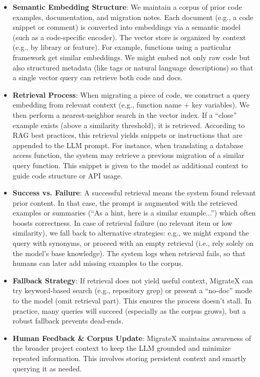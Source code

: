 \documentclass[twocolumn]{article}
\begin{document}
\begin{itemize}
    \item \textbf{Semantic Embedding Structure}: We maintain a corpus of prior code examples, documentation, and migration notes. Each document (e.g., a code snippet or comment) is converted into embeddings via a semantic model (such as a code-specific encoder). The vector store is organized by context (e.g., by library or feature). For example, functions using a particular framework get similar embeddings. We might embed not only raw code but also structured metadata (like tags or natural language descriptions) so that a single vector query can retrieve both code and docs.

    \item \textbf{Retrieval Process}: When migrating a piece of code, we construct a query embedding from relevant context (e.g., function name + key variables). We then perform a nearest-neighbor search in the vector index. If a “close” example exists (above a similarity threshold), it is retrieved. According to RAG best practices, this retrieval yields snippets or instructions that are appended to the LLM prompt. For instance, when translating a database access function, the system may retrieve a previous migration of a similar query function. This snippet is given to the model as additional context to guide code structure or API usage.

    \item \textbf{Success vs. Failure}: A successful retrieval means the system found relevant prior content. In that case, the prompt is augmented with the retrieved examples or summaries (``As a hint, here is a similar example...'') which often boosts correctness. In case of retrieval failure (no relevant item or low similarity), we fall back to alternative strategies: e.g., we might expand the query with synonyms, or proceed with an empty retrieval (i.e., rely solely on the model’s base knowledge). The system logs when retrieval fails, so that humans can later add missing examples to the corpus.

    \item \textbf{Fallback Strategy}: If retrieval does not yield useful context, MigrateX can try keyword-based search (e.g., repository grep) or present a ``no-doc'' mode to the model (omit retrieval part). This ensures the process doesn’t stall. In practice, many queries will succeed (especially as the corpus grows), but a robust fallback prevents dead-ends.

    \item \textbf{Human Feedback \& Corpus Update}: MigrateX maintains awareness of the broader project context to keep the LLM grounded and minimize repeated information. This involves storing persistent context and smartly querying it as needed.


\end{itemize}
\end{document}
